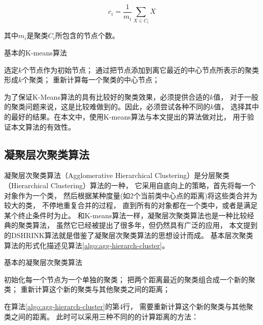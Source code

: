 \begin{equation}
    c_i = \frac{1}{m_i} \sum_{X \in C_i} X
\end{equation}

其中$m_i$是聚类$C_i$所包含的节点个数。

\begin{algorithm}[htb]
    \caption{基本的K-means算法}
    \label{algo:kmeans}
    \begin{algorithmic}[1]
        \State 选定$k$个节点作为初始节点；
        \Repeat
            \State 通过把节点添加到离它最近的中心节点所表示的聚类形成$k$个聚类；
            \State 重新计算每一个聚类的中心节点；
    \end{algorithmic}
\end{algorithm}

为了保证K-Means算法的具有比较好的聚类效果，必须提供合适的$k$值，
对于一般的聚类问题来说，这是比较难做到的。因此，必须尝试各种不同的$k$值，
选择其中的最好的结果。在本文中，使用K-means算法与本文提出的算法做对比，
用于验证本文算法的有效性。

\subsection{凝聚层次聚类算法}

凝聚层次聚类算法（Agglomerative Hierarchical Clustering）是分层聚类（Hierarchical Clustering）算法的一种，
它采用自底向上的策略，首先将每一个对象作为一个类，
然后根据某种度量(如2个当前类中心点的距离)将这些类合并为较大的类，
不停地重复合并的过程，
直到所有的对象都在一个类中，或者是满足某个终止条件时为止。
和K-means算法一样，凝聚层次聚类算法也是一种比较经典的聚类算法，
虽然它已经被提出了很多年，但仍然具有广泛的应用，
本文提到的DSHRINK算法就是借鉴了凝聚层次聚类算法的思想设计而成。
基本层次聚类算法的形式化描述见算法\ref{algo:agg-hierarch-cluster}。

\begin{algorithm}[htb]
    \caption{基本的凝聚层次聚类算法}
    \label{algo:agg-hierarch-cluster}
    \begin{algorithmic}[1]
        \State 初始化每一个节点为一个单独的聚类；
        \Repeat
            \State 把两个距离最近的聚类组合成一个新的聚类；
            \State 重新计算这个新的聚类与其他聚类之间的距离；
    \end{algorithmic}
\end{algorithm}

在算法\ref{algo:agg-hierarch-cluster}的第4行，
需要重新计算这个新的聚类与其他聚类之间的距离。
此时可以采用三种不同的的计算距离的方法：

